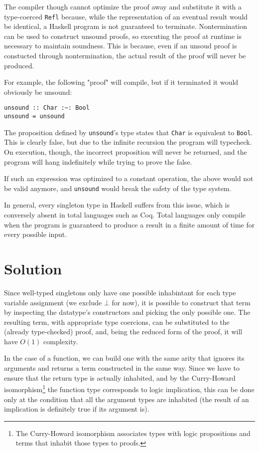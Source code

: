 The compiler though cannot optimize the proof away and substitute it with a type-coerced \texttt{Refl} because, while the representation of an eventual result would be identical, a Haskell program is not guaranteed to terminate. Nontermination can be used to construct unsound proofs, so executing the proof at runtime is necessary to maintain soundness.
This is because, even if an unsoud proof is constucted through nontermination, the actual result of the proof will never be produced.

For example, the following "proof" will compile, but if it terminated it would obviously be unsound:

\begin{lstlisting}[caption=Proving the false through nontermination]
unsound :: Char :~: Bool
unsound = unsound
\end{lstlisting}

The proposition defined by \texttt{unsound}'s type states that \texttt{Char} is equivalent to \texttt{Bool}. This is clearly false, but due to the infinite recursion the program will typecheck. On execution, though, the incorrect proposition will never be returned, and the program will hang indefinitely while trying to prove the false.

If such an expression was optimized to a constant operation, the above would not be valid anymore, and \texttt{unsound} would break the safety of the type system.

In general, every singleton type in Haskell suffers from this issue, which is conversely absent in total languages such as Coq.
Total languages only compile when the program is guaranteed to produce a result in a finite amount of time for every possible input.

\chapter{Solution}
\label{cha:solution}

Since well-typed singletons only have one possible inhabintant for each type variable assignment (we exclude $\bot$ for now), it is possible to construct that term by inspecting the datatype's constructors and picking the only possible one.
The resulting term, with appropriate type coercions, can be substituted to the (already type-checked) proof, and, being the reduced form of the proof, it will have $O(1)$ complexity.

In the case of a function, we can build one with the same arity that ignores its arguments and returns a term constructed in the same way.
Since we have to ensure that the return type is actually inhabited, and by the Curry-Howard isomorphism\footnote{The Curry-Howard isomorphism associates types with logic propositions and terms that inhabit those types to proofs.} the function type corresponds to logic implication, this can be done only at the condition that all the argument types are inhabited (the result of an implication is definitely true if its argument is).

